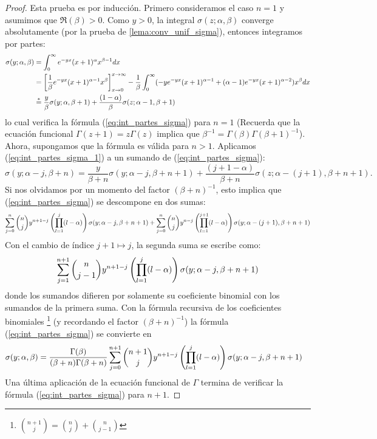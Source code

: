 \begin{proof}
  Esta prueba es por inducci\'on. Primero consideramos el caso $n=1$ y asumimos que $\Re(\beta)>0$.
  Como $y>0$, la integral $\sigma(z;\alpha,\beta)$ converge absolutamente (por la prueba de
  \ref{lema:conv_unif_sigma}), entonces integramos por partes:
  \begin{align}
    \sigma(y;\alpha,\beta)
    &=\int_0^{\infty}e^{-yx}(x+1)^{\alpha}x^{\beta-1}dx \nonumber\\
    &=\left[\frac{1}{\beta}e^{-yx}(x+1)^{\alpha-1}x^{\beta}\right]_{x\rightarrow0}^{x\rightarrow\infty}-\frac{1}{\beta}
      \int_0^{\infty}(-ye^{-yx}(x+1)^{\alpha-1}+(\alpha-1)e^{-yx}(x+1)^{\alpha-2})x^{\beta}dx\nonumber\\
    &\overset{*}{=}\frac{y}{\beta}\sigma(y;\alpha,\beta+1)+
      \frac{(1-\alpha)}{\beta}\sigma(z;\alpha-1,\beta+1)\label{eq:int_partes_sigma_1}
  \end{align}
  lo cual verifica la f\'ormula (\ref{eq:int_partes_sigma}) para $n=1$ (Recuerda que la ecuaci\'on
  funcional $\Gamma(z+1)=z\Gamma(z)$ implica que $\beta^{-1}=\Gamma(\beta)\Gamma(\beta+1)^{-1}$).
  Ahora, supongamos que la f\'ormula es v\'alida para $n>1$. Aplicamos (\ref{eq:int_partes_sigma_1})
  a un sumando de (\ref{eq:int_partes_sigma}):
  \[
    \sigma(y;\alpha-j,\beta+n)=\frac{y}{\beta+n}\sigma(y;\alpha-j,\beta+n+1)+
      \frac{(j+1-\alpha)}{\beta+n}\sigma(z;\alpha-(j+1),\beta+n+1).
  \]
  Si nos olvidamos por un momento del factor $(\beta+n)^{-1}$, esto implica que
  (\ref{eq:int_partes_sigma}) se descompone en dos sumas:
  \[
    \sum_{j=0}^n\binom{n}{j}y^{n+1-j}\left( \prod_{l=1}^j(l-\alpha) \right)\sigma(y;\alpha-j,\beta+n+1)+
    \sum_{j=0}^n\binom{n}{j}y^{n-j}\left( \prod_{l=1}^{j+1}(l-\alpha) \right)\sigma(y;\alpha-(j+1),\beta+n+1)
  \]
  Con el cambio de \'indice $j+1\mapsto j$, la segunda suma se escribe como:
  \[
    \sum_{j=1}^{n+1}\binom{n}{j-1}y^{n+1-j}
    \left( \prod_{l=1}^{j}(l-\alpha) \right)\sigma(y;\alpha-j,\beta+n+1)
  \]
  donde los  sumandos difieren por solamente su coeficiente binomial con los sumandos de la primera
  suma. Con la f\'ormula recursiva de los coeficientes binomiales%
  \footnote{$\binom{n+1}{j}=\binom{n}{j}+\binom{n}{j-1}$} (y recordando el factor $(\beta+n)^{-1}$)
  la f\'ormula (\ref{eq:int_partes_sigma}) se convierte en
  \begin{align*}
    \sigma(y;\alpha,\beta)
    &=\frac{\Gamma(\beta)}{(\beta+n)\Gamma(\beta+n)}\sum_{j=0}^{n+1}
    \binom{n+1}{j}y^{n+1-j}\left( \prod_{l=1}^j(l-\alpha) \right)\sigma(y;\alpha-j,\beta+n+1)
  \end{align*}
  Una \'ultima aplicaci\'on de la ecuaci\'on funcional de $\Gamma$ termina de verificar la
  f\'ormula (\ref{eq:int_partes_sigma}) para $n+1$.
\end{proof}



